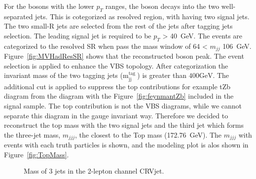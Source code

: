 For the bosons with the lower $p_T$ ranges, the boson decays into the two well-separated jets. This is cotegorized as resolved region, with having two signal jets. The two small-R jets are selected from the rest of the jets after tagging jets selection. The leading signal jet is required to be $p_T$ > 40~GeV. The events are categorized to the resolved SR when pass the mass window of 64 < $m_{jj}$ 106~GeV. Figure~\ref{fig:MVHadResSR} shows that the reconstructed boson peak.
The event selection is applied to enhance the VBS topology. After categorization the invariant mass of the two tagging jets ($\mathrm{m}_{\mathrm{jj}}^{\text {tag }}$) is greater than $400 \mathrm{GeV}$.
The additional cut is applied to suppress the top contributions for example tZb diagram from the diagram with the Figure~\ref{fig:feynmantZb} included in the signal sample. The top contribution is not the VBS diagrams, while we cannot separate this diagram in the gauge invariant way. Therefore we decided to reconstruct the top mass with the two signal jets and the third jet which forms the three-jet mass, $m_{jjj}$, the closest to the Top mass (172.76~GeV). The $m_{jjj}$ with events with each truth particles is shown, and the modeling plot is alos shown in Figure~\ref{fig:TopMass}. 
\begin{figure}[ht]
    \begin{center}
        \caption{ Mass of 3 jets in the 2-lepton channel CRVjet.}
        \label{fig:2leptopMass}
    \end{center}
\end{figure}

